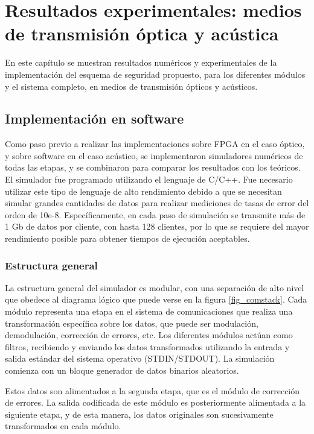 \chapter{Resultados experimentales: medios de transmisión óptica y acústica}
\label{simulations}
En este capítulo se muestran resultados numéricos y experimentales de la implementación del esquema de seguridad propuesto, para los diferentes módulos y el sistema completo, en medios de transmisión ópticos y acústicos. 
\section{Implementación en software}
Como paso previo a realizar las implementaciones sobre FPGA en el caso óptico, y sobre software en el caso acústico, se implementaron simuladores numéricos de todas las etapas, y se combinaron para comparar los resultados con los teóricos. El simulador fue programado utilizando el lenguaje de C/C++. Fue necesario utilizar este tipo de lenguaje de alto rendimiento debido a que se necesitan simular grandes cantidades de datos para realizar mediciones de tasas de error del orden de 10e-8. Específicamente, en cada paso de simulación se transmite más de 1 Gb de datos por cliente, con hasta 128 clientes, por lo que se requiere del mayor rendimiento posible para obtener tiempos de ejecución aceptables.

\subsection{Estructura general}

La estructura general del simulador es modular, con una separación de alto nivel que obedece al diagrama lógico que puede verse en la figura \ref{fig_comstack}.
Cada módulo representa una etapa en el sistema de comunicaciones que realiza una transformación específica sobre los datos, que puede ser modulación, demodulación, corrección de errores, etc. Los diferentes módulos actúan como filtros, recibiendo y enviando los datos transformados utilizando la entrada y salida estándar del sistema operativo (STDIN/STDOUT). La simulación comienza con un bloque generador de datos binarios aleatorios.

Estos datos son alimentados a la segunda etapa, que es el módulo de corrección de errores. La salida codificada de este módulo es posteriormente alimentada a la siguiente etapa, y de esta manera, los datos originales son sucesivamente transformados en cada módulo.


